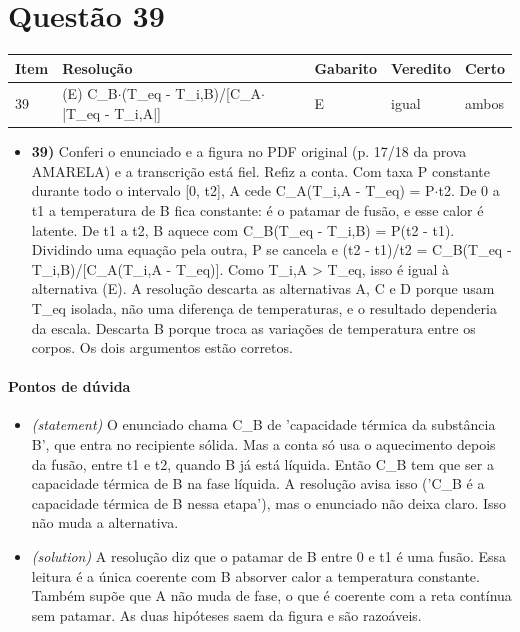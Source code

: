 \documentclass{article}%
\begin{document}
\section*{Questão 39}%
\begin{longtable}{@{}p{} p{} p{} p{} p{}@{}}\toprule Item & Resolução & Gabarito & Veredito & Certo \\ \midrule
39 & (E) C\_B$\cdot$(T\_eq - T\_i,B)/{[}C\_A$\cdot$|T\_eq - T\_i,A|{]} & E & igual & ambos \\
\bottomrule\end{longtable}%
\begin{itemize}%
\item%
\textbf{39)} Conferi o enunciado e a figura no PDF original (p. 17/18 da prova AMARELA) e a transcrição está fiel. Refiz a conta. Com taxa P constante durante todo o intervalo {[}0, t2{]}, A cede C\_A(T\_i,A - T\_eq) = P$\cdot$t2. De 0 a t1 a temperatura de B fica constante: é o patamar de fusão, e esse calor é latente. De t1 a t2, B aquece com C\_B(T\_eq - T\_i,B) = P(t2 - t1). Dividindo uma equação pela outra, P se cancela e (t2 - t1)/t2 = C\_B(T\_eq - T\_i,B)/{[}C\_A(T\_i,A - T\_eq){]}. Como T\_i,A > T\_eq, isso é igual à alternativa (E). A resolução descarta as alternativas A, C e D porque usam T\_eq isolada, não uma diferença de temperaturas, e o resultado dependeria da escala. Descarta B porque troca as variações de temperatura entre os corpos. Os dois argumentos estão corretos.%
\end{itemize}%
\paragraph{Pontos de dúvida}%
\begin{itemize}%
\item%
\textit{(statement)} O enunciado chama C\_B de 'capacidade térmica da substância B', que entra no recipiente sólida. Mas a conta só usa o aquecimento depois da fusão, entre t1 e t2, quando B já está líquida. Então C\_B tem que ser a capacidade térmica de B na fase líquida. A resolução avisa isso ('C\_B é a capacidade térmica de B nessa etapa'), mas o enunciado não deixa claro. Isso não muda a alternativa.%
\item%
\textit{(solution)} A resolução diz que o patamar de B entre 0 e t1 é uma fusão. Essa leitura é a única coerente com B absorver calor a temperatura constante. Também supõe que A não muda de fase, o que é coerente com a reta contínua sem patamar. As duas hipóteses saem da figura e são razoáveis.%
\end{itemize}%
\end{document}
